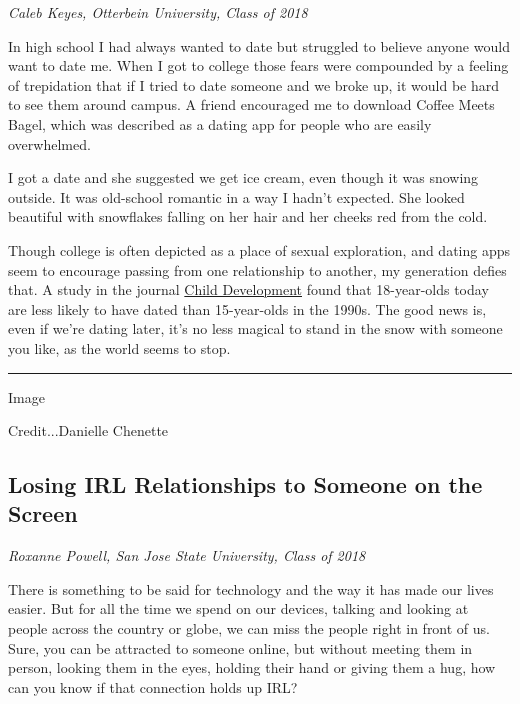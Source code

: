 \emph{Caleb Keyes, Otterbein University, Class of 2018}

In high school I had always wanted to date but struggled to believe
anyone would want to date me. When I got to college those fears were
compounded by a feeling of trepidation that if I tried to date someone
and we broke up, it would be hard to see them around campus. A friend
encouraged me to download Coffee Meets Bagel, which was described as a
dating app for people who are easily overwhelmed.

I got a date and she suggested we get ice cream, even though it was
snowing outside. It was old-school romantic in a way I hadn't expected.
She looked beautiful with snowflakes falling on her hair and her cheeks
red from the cold.

Though college is often depicted as a place of sexual exploration, and
dating apps seem to encourage passing from one relationship to another,
my generation defies that. A study in the journal
\href{http://onlinelibrary.wiley.com/doi/10.1111/cdev.12930/abstract}{Child
Development} found that 18-year-olds today are less likely to have dated
than 15-year-olds in the 1990s. The good news is, even if we're dating
later, it's no less magical to stand in the snow with someone you like,
as the world seems to stop.

\begin{center}\rule{0.5\linewidth}{\linethickness}\end{center}

Image

Credit...Danielle Chenette

\hypertarget{losing-irl-relationships-to-someone-on-the-screen}{%
\subsection{Losing IRL Relationships to Someone on the
Screen}\label{losing-irl-relationships-to-someone-on-the-screen}}

\emph{Roxanne Powell, San Jose State University, Class of 2018}

There is something to be said for technology and the way it has made our
lives easier. But for all the time we spend on our devices, talking and
looking at people across the country or globe, we can miss the people
right in front of us. Sure, you can be attracted to someone online, but
without meeting them in person, looking them in the eyes, holding their
hand or giving them a hug, how can you know if that connection holds up
IRL?

